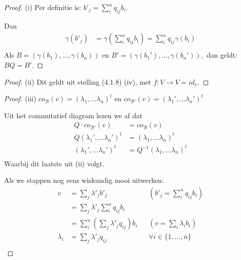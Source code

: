 \begin{proof}(i) 
    Per definitie is: \(b'_j = \sum_i^n q_{ij}b_i\).

    Dan 
    \begin{align*}
        \gamma (b'_j) 
        &=  \gamma(\sum_i^n q_{ij}b_i)
        =  \sum_i^n q_{ij}\gamma(b_i)\\ 
    \end{align*}
    Als
       \( B = (\gamma(b_1),
       \dots, \gamma(b_n)) \text{ en } B' = (\gamma(b_1'), \dots, \gamma(b_n')),\)
       dan geldt: \(B Q = B'\).
\end{proof}
\begin{proof}(ii) 
    Dit geldt uit stelling (4.1.8) (iv), met \(f:V\to V = id_v\).
\end{proof}
\begin{proof}(iii)
     \(co_{\mathcal{B}}(v) = (\lambda_1,\dots\lambda_n)^t\)
    en
    \(co_{\mathcal{B'}}(v) = (\lambda_1',\dots\lambda_n')^t\)

    Uit het commutatief diagram lezen we af dat
    \begin{align*}
        Q \cdot co_{\mathcal{B'}}(v) &= co_{\mathcal{B}}(v)\\
        Q (\lambda_1',\dots\lambda_n')^t &= (\lambda_1,\dots\lambda_n)^t\\
         (\lambda_1',\dots\lambda_n')^t &= Q^{-1} (\lambda_1,\dots\lambda_n)^t\\
    \end{align*}
    Waarbij dit laatste uit (ii) volgt.

    Als we stappen nog eens wiskundig mooi uitwerken:
    \begin{align*}
        v &= \sum_j \lambda'_j b'_j && (b'_j = \sum_i^n q_{ij}b_i) \\
        &= \sum_j \lambda'_j \sum_i^n q_{ij}b_i \\
         &= \sum_i^n \left(\sum_j \lambda'_j q_{ij}\right)b_i && (v = \sum_i\lambda_ib_i)\\
          \lambda_i &=  \sum_j \lambda'_j q_{ij} && \forall i \in \{1,\dots,n\}\\
    \end{align*}


\end{proof}


